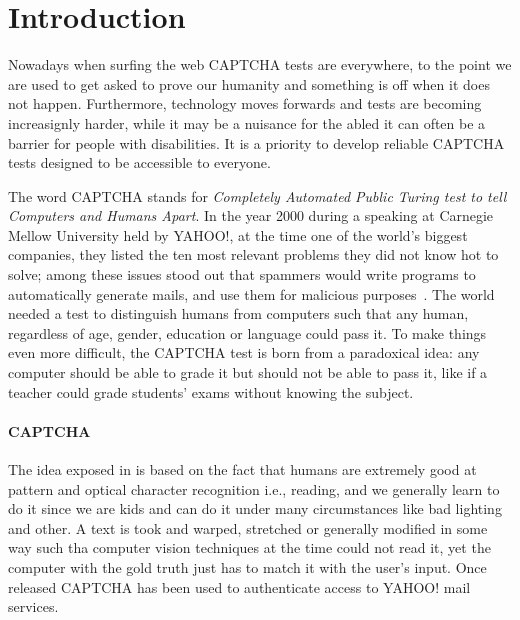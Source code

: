 \section{Introduction}
Nowadays when surfing the web CAPTCHA tests are everywhere, to the point we are used to get asked to prove our humanity and something is off when it does not happen.
Furthermore, technology moves forwards and tests are becoming increasignly harder, while it may be a nuisance for the abled it can often be a barrier for people with disabilities.
It is a priority to develop reliable CAPTCHA tests designed to be accessible to everyone.

The word CAPTCHA stands for \emph{Completely Automated Public Turing test to tell Computers and Humans Apart}.
In the year 2000 during a speaking at Carnegie Mellow University held by YAHOO!, at the time one of the world's biggest companies, they listed the ten most relevant problems they did not know hot to solve; among these issues stood out that spammers would write programs to automatically generate mails, and use them for malicious purposes~\cite{vox2021captcha,theverge2019captcha}.
The world needed a test to distinguish humans from computers such that any human, regardless of age, gender, education or language could pass it.
To make things even more difficult, the CAPTCHA test is born from a paradoxical idea: any computer should be able to grade it but should not be able to pass it, like if a teacher could grade students' exams without knowing the subject.

\paragraph{CAPTCHA}
The idea exposed in \cite{vonahn2003captcha} is based on the fact that humans are extremely good at pattern and optical character recognition i.e., reading, and we
generally learn to do it since we are kids and can do it under many circumstances like bad lighting and other.
A text is took and warped, stretched or generally modified in some way such tha computer vision techniques at the time could not read it, yet the computer with the gold truth just has to match it with the user's input.
Once released CAPTCHA has been used to authenticate access to YAHOO! mail services.

